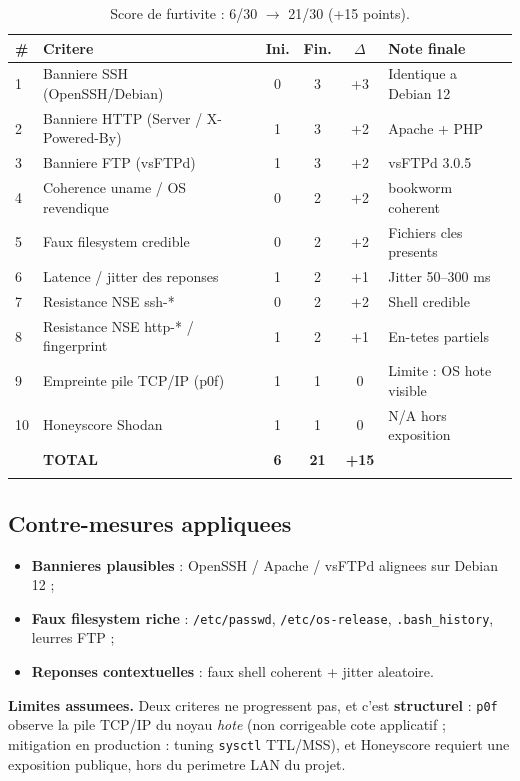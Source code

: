 \documentclass[11pt,a4paper]{article}
\begin{document}
\begin{longtable}{@{}p{0.4cm}p{6.2cm}ccc>{\raggedright\arraybackslash}p{3.2cm}@{}}
\toprule
\rowcolor{primary!8}\textbf{\#} & \textbf{Critere} & \textbf{Ini.} & \textbf{Fin.} & \textbf{$\Delta$} & \textbf{Note finale} \\
\midrule
\endhead
1 & Banniere SSH (OpenSSH/Debian) & 0 & 3 & +3 & Identique a Debian 12 \\
2 & Banniere HTTP (Server / X-Powered-By) & 1 & 3 & +2 & Apache + PHP \\
3 & Banniere FTP (vsFTPd) & 1 & 3 & +2 & vsFTPd 3.0.5 \\
4 & Coherence uname / OS revendique & 0 & 2 & +2 & bookworm coherent \\
5 & Faux filesystem credible & 0 & 2 & +2 & Fichiers cles presents \\
6 & Latence / jitter des reponses & 1 & 2 & +1 & Jitter 50--300 ms \\
7 & Resistance NSE ssh-* & 0 & 2 & +2 & Shell credible \\
8 & Resistance NSE http-* / fingerprint & 1 & 2 & +1 & En-tetes partiels \\
9 & Empreinte pile TCP/IP (p0f) & 1 & 1 & 0 & Limite : OS hote visible \\
10 & Honeyscore Shodan & 1 & 1 & 0 & N/A hors exposition \\
\midrule
\rowcolor{ok!10} & \textbf{TOTAL} & \textbf{6} & \textbf{21} & \textbf{+15} & \\
\bottomrule
\caption{Score de furtivite : 6/30 $\rightarrow$ 21/30 (+15 points).}
\end{longtable}

\subsection{Contre-mesures appliquees}
\begin{itemize}[leftmargin=1.5em,noitemsep]
  \item \textbf{Bannieres plausibles} : OpenSSH / Apache / vsFTPd alignees sur Debian 12 ;
  \item \textbf{Faux filesystem riche} : \texttt{/etc/passwd}, \texttt{/etc/os-release},
        \texttt{.bash\_history}, leurres FTP ;
  \item \textbf{Reponses contextuelles} : faux shell coherent + jitter aleatoire.
\end{itemize}

\begin{warnbox}
\textbf{Limites assumees.} Deux criteres ne progressent pas, et c'est \textbf{structurel} :
\texttt{p0f} observe la pile TCP/IP du noyau \emph{hote} (non corrigeable cote
applicatif ; mitigation en production : tuning \texttt{sysctl} TTL/MSS), et Honeyscore
requiert une exposition publique, hors du perimetre LAN du projet.
\end{warnbox}
\end{document}
